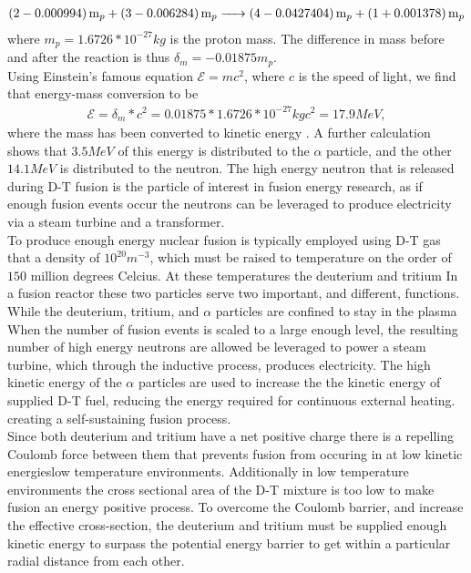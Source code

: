 \documentclass{article}
\begin{document}
\begin{align*}
\ce{(2 - 0.000994)m_p +(3 - 0.006284) m_p -> (4 - 0.0427404)m_p + (1 + 0.001378)m_p}
\end{align*}
where $m_p=1.6726*10^{-27}kg$ is the proton mass. The difference in mass before and after the reaction is thus $\delta_m = -0.01875m_p$.\\
Using Einstein's famous equation $\mathcal{E} = mc^2$, where $c$ is the speed of light, we find that energy-mass conversion to be
\begin{align*}
\mathcal{E} = \delta_m *c^2 = 0.01875*1.6726*10^{-27}kg c^2 = 17.9 MeV,
\end{align*}
where the mass has been converted to kinetic energy \cite{john_wesson_tokamaks_2005}.
A further calculation shows that $3.5 MeV$ of this energy is distributed to the $\alpha$ particle, and the other $14.1 MeV$ is distributed to the neutron. The high energy neutron that is released during D-T fusion is the particle of interest in fusion energy research, as if enough fusion events occur the neutrons can be leveraged to produce electricity via a steam turbine and a transformer. \\
To produce enough energy nuclear fusion is typically employed using D-T gas that a density of $10^{20}m^{-3}$, which must be raised to temperature on the order of $150$ million degrees Celcius. At these temperatures the deuterium and tritium
In a fusion reactor these two particles serve two important, and different, functions. While the deuterium, tritium, and $\alpha$ particles are confined to stay in the plasma When the number of fusion events is scaled to a large enough level, the resulting number of high energy neutrons are allowed be leveraged to power a steam turbine, which through the inductive process, produces electricity. The high kinetic energy of the $\alpha$ particles are used to increase the the kinetic energy of supplied D-T fuel, reducing the energy required for continuous external heating. creating a self-sustaining fusion process. \\

Since both deuterium and tritium have a net positive charge there is a repelling Coulomb force between them that prevents fusion from occuring in at low kinetic energieslow temperature environments. Additionally in low temperature environments the cross sectional area of the D-T mixture is too low to make fusion an energy positive process. To overcome the Coulomb barrier, and increase the effective cross-section, the deuterium and tritium must be supplied enough kinetic energy to surpass the potential energy barrier to get within a particular radial distance from each other.
\end{document}
